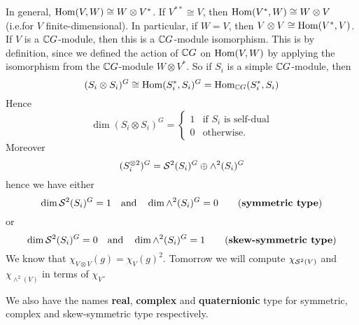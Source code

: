 In general, $\operatorname{Hom}(V,W) \cong W \otimes V^*$.
If $V^{**} \cong V$, then $\operatorname{Hom}(V^*,W) \cong W \otimes V$ (i.e.\@ for $V$ finite-dimensional).
In particular, if $W=V$, then $V \otimes V \cong \operatorname{Hom}(V^*,V)$.
If $V$ is a $\mathbb{C} G$-module, then this is a $\mathbb{C} G$-module isomorphism.
This is by definition, since we defined the action of $\mathbb{C} G$ on $\operatorname{Hom}(V,W)$ by applying the isomorphism from the $\mathbb{C} G$-module $W \otimes V^*$.
So if $S_i$ is a simple $\mathbb{C} G$-module, then
\[ (S_i \otimes S_i)^G \cong \operatorname{Hom}(S_i^*,S_i)^G = \operatorname{Hom}_{\mathbb{C} G}(S_i^*,S_i) \]
Hence
\[ \dim(S_i \otimes S_i)^G=
  \begin{cases}
    1 &\text{if $S_i$ is self-dual} \\
    0 &\text{otherwise.}
  \end{cases}
\]
Moreover
\[ (S_i^{\otimes 2})^G = \mathcal{S}^2(S_i)^G \oplus \wedge^2(S_i)^G \]
hence we have either
\[ \dim\mathcal{S}^2(S_i)^G = 1 \quad\text{and}\quad \dim\wedge^2(S_i)^G = 0 \qquad\text{(\textbf{symmetric type})} \]
or
\[ \dim\mathcal{S}^2(S_i)^G = 0 \quad\text{and}\quad \dim\wedge^2(S_i)^G = 1 \qquad\text{(\textbf{skew-symmetric type})} \]
We know that $\chi_{V \otimes V}(g) = \chi_V(g)^2$.
Tomorrow we will compute $\chi_{\mathcal{S}^2(V)}$ and $\chi_{\wedge^2(V)}$ in terms of $\chi_V$.

\begin{rmk}
  We also have the names \textbf{real}, \textbf{complex} and \textbf{quaternionic} type for symmetric, complex and skew-symmetric type respectively.
\end{rmk}
